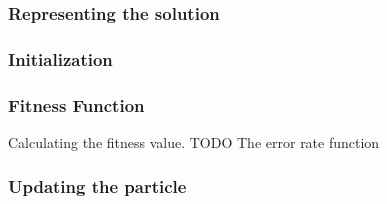 \documentclass[runningheads,a4paper]{llncs}
\begin{document}
\subsubsection{Representing the solution}

\subsubsection{Initialization}

\subsubsection{Fitness Function}
Calculating the fitness value.
{\color{red} TODO The error rate function}

\subsubsection{Updating the particle}




%	
\end{document}
